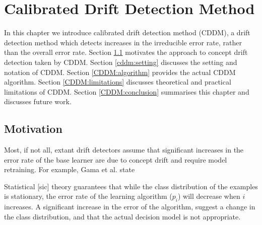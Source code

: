 \chapter{Calibrated Drift Detection Method} \label{chapt:CDDM}

In this chapter we introduce calibrated drift detection method (CDDM), a drift detection method which detects increases in the irreducible error rate, rather than the overall error rate. Section \ref{CDDM:motivation} motivates the approach to concept drift detection taken by CDDM. Section \ref{cddm:setting} discusses the setting and notation of CDDM. Section \ref{CDDM:algorithm} provides the actual CDDM algorithm. Section \ref{CDDM:limitations} discusses theoretical and practical limitations of CDDM. Section \ref{CDDM:conclusion} summarises this chapter and discusses future work. 


\section{Motivation} \label{CDDM:motivation}

Most, if not all, extant drift detectors assume that significant increases in the error rate of the base learner are due to concept drift and require model retraining. For example, Gama et al. \cite{DDM} state 
\begin{displayquote}
    Statistical [sic] theory \cite{statistical_theory} guarantees that while the class distribution of the examples is stationary, the error rate of the learning algorithm ($p_i$) will decrease when $i$ increases. A significant increase in the error of the algorithm, suggest a change in the class distribution, and that the actual decision model is not appropriate.
\end{displayquote}

